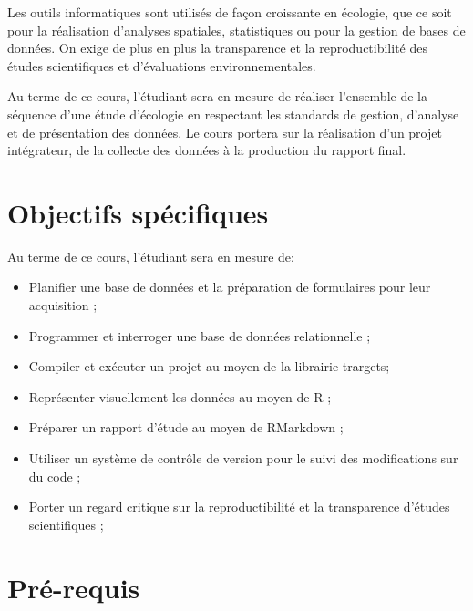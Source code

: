 \documentclass[12]{article}
\begin{document}
	Les outils informatiques sont utilisés de façon croissante en écologie,
	que ce soit pour la réalisation d'analyses spatiales, statistiques ou pour
	la gestion de bases de données. On exige de plus en plus la transparence et
	la reproductibilité des études scientifiques et d'évaluations environnementales. 

	Au terme de ce cours, l'étudiant sera en mesure de réaliser l'ensemble de la 
	séquence d'une étude d'écologie en respectant les standards de gestion,  d'analyse et de présentation des données. Le cours portera sur la réalisation d'un projet intégrateur, de la collecte des données à la production du rapport final. 

	\section*{Objectifs spécifiques}

	Au terme de ce cours, l'étudiant sera en mesure de: 

	\begin{itemize}
	\renewcommand{\labelitemi}{$\bullet$}

	\item Planifier une base de données et la préparation de formulaires pour leur acquisition ; 

	\item Programmer et interroger une base de données relationnelle ;

	\item Compiler et exécuter un projet au moyen de la librairie trargets;

	\item Représenter visuellement les données au moyen de R ;

	\item Préparer un rapport d'étude au moyen de RMarkdown ;

	\item Utiliser un système de contrôle de version pour le suivi des modifications sur du code ;

	\item Porter un regard critique sur la reproductibilité et la transparence d'études scientifiques ;

	\end{itemize}

	\section*{Pré-requis}
\end{document}
